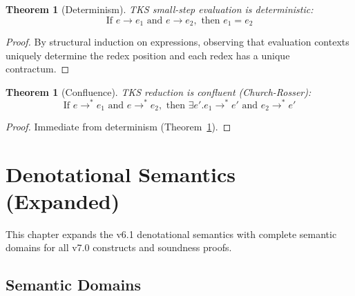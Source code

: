 \documentclass[11pt,twoside,openright]{book}
\theoremstyle{definition}
\theoremstyle{plain}
\newtheorem{theorem}[definition]{Theorem}
\theoremstyle{remark}
\newcommand{\smallstep}{\to}
\newcommand{\vexp}{\textcolor{green!50!black}{\textbf{[EXPANDED v7.0]}}}
\begin{document}
\begin{theorem}[Determinism]
\label{thm:determinism}
TKS small-step evaluation is deterministic:
\[
\text{If } e \smallstep e_1 \text{ and } e \smallstep e_2, \text{ then } e_1 = e_2
\]
\end{theorem}

\begin{proof}
By structural induction on expressions, observing that evaluation contexts uniquely determine the redex position and each redex has a unique contractum.
\end{proof}

\begin{theorem}[Confluence]
\label{thm:confluence}
TKS reduction is confluent (Church-Rosser):
\[
\text{If } e \smallstep^* e_1 \text{ and } e \smallstep^* e_2, \text{ then } \exists e'. e_1 \smallstep^* e' \text{ and } e_2 \smallstep^* e'
\]
\end{theorem}

\begin{proof}
Immediate from determinism (Theorem~\ref{thm:determinism}).
\end{proof}

\chapter{Denotational Semantics (Expanded)}
\label{ch:denotational-expanded}

\begin{tcolorbox}[colback=green!5!white,colframe=green!75!black,title=\vexp]
This chapter expands the v6.1 denotational semantics with complete semantic domains for all v7.0 constructs and soundness proofs.
\end{tcolorbox}

\section{Semantic Domains}
\end{document}
